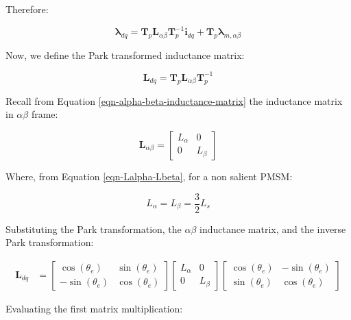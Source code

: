 \documentclass{article}
\begin{document}
Therefore:

\begin{equation}
    \boldsymbol{\lambda}_{dq} 
    =
    \mathbf{T}_p\mathbf{L}_{\alpha\beta}\mathbf{T}_p^{-1}\mathbf{i}_{dq} + \mathbf{T}_p\boldsymbol{\lambda}_{m,\alpha\beta}
\end{equation}

Now, we define the Park transformed inductance matrix:

\begin{equation}
    \mathbf{L}_{dq} = \mathbf{T}_p\mathbf{L}_{\alpha\beta}\mathbf{T}_p^{-1}
\end{equation}

Recall from Equation \ref{eqn-alpha-beta-inductance-matrix} the inductance matrix in $\alpha\beta$ frame:

\begin{equation}
    \mathbf{L}_{\alpha\beta} =
    \begin{bmatrix}
        L_\alpha & 0 \\
        0 & L_\beta
    \end{bmatrix}
\end{equation}

Where, from Equation \ref{eqn-Lalpha-Lbeta}, for a non salient PMSM:

\begin{equation}
    L_\alpha = L_\beta = \frac{3}{2}L_s
\end{equation}

Substituting the Park transformation, the $\alpha\beta$ inductance matrix,
and the inverse Park transformation:

\begin{align}
    \mathbf{L}_{dq}
    &=
    \begin{bmatrix}
        \cos(\theta_e) & \sin(\theta_e) \\
        -\sin(\theta_e) & \cos(\theta_e)
    \end{bmatrix}
    \begin{bmatrix}
        L_\alpha & 0 \\
        0 & L_\beta
    \end{bmatrix}
    \begin{bmatrix}
        \cos(\theta_e) & -\sin(\theta_e) \\
        \sin(\theta_e) & \cos(\theta_e)
    \end{bmatrix}
\end{align}

Evaluating the first matrix multiplication:
\end{document}
